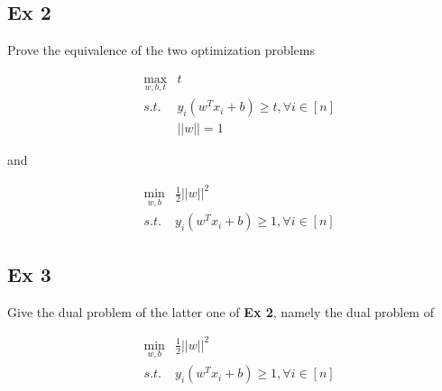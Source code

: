 \documentclass[UTF8]{article}
\begin{document}
\subsection{Ex 2}
Prove the equivalence of the two optimization problems\par
\begin{eqnarray*}
 &\max_{w,b,t} &t \\
&s.t. &y_{i}(w^{T}x_{i}+b)\geq t,\forall i\in[n]\\
& &||w||=1
\end{eqnarray*}\par
and\par
\begin{eqnarray*}
&\min_{w,b} & \frac{1}{2}||w||^{2}\\
&s.t. &y_{i}(w^{T}x_{i}+b)\geq 1,\forall i\in[n]
\end{eqnarray*}
\subsection{Ex 3}
Give the dual problem of the latter one of \textbf{Ex 2}, namely the dual problem of\par
\begin{eqnarray*}
&\min_{w,b} & \frac{1}{2}||w||^{2}\\
&s.t. &y_{i}(w^{T}x_{i}+b)\geq 1,\forall i\in[n]
\end{eqnarray*}
\end{document}
